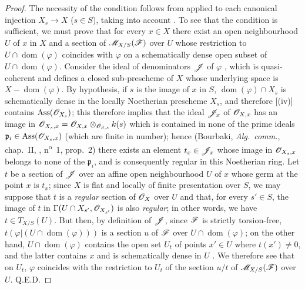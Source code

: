 \begin{proof}
The necessity of the condition follows from  applied to each canonical injection $X_s\to X$ ($s\in S$), taking into account .
To see that the condition is sufficient, we must prove that for every $x\in X$ there exist an open neighbourhood $U$ of $x$ in $X$ and a section of $\mathscr{M}_{X/S}(\mathscr{F})$ over $U$ whose restriction to $U\cap\operatorname{dom}(\varphi)$ coincides with $\varphi$ on a schematically dense open subset of $U\cap\operatorname{dom}(\varphi)$.
Consider the ideal of denominators $\mathscr{J}$ of $\varphi$ , which is quasi-coherent and defines a closed sub-prescheme of $X$ whose underlying space is $X-\operatorname{dom}(\varphi)$.
By hypothesis, if $s$ is the image of $x$ in $S$, $\operatorname{dom}(\varphi)\cap X_s$ is schematically dense in the locally Noetherian prescheme $X_s$, and therefore [(iv)] contains $\operatorname{Ass}(\mathscr{O}_{X_s})$; this therefore implies that the ideal $\mathscr{J}_x$ of $\mathscr{O}_{X,x}$ has an image in $\mathscr{O}_{X_s,x}=\mathscr{O}_{X,x}\otimes_{\mathscr{O}_{S,s}}k(s)$ which is contained in none of the prime ideals $\mathfrak{p}_i\in\operatorname{Ass}(\mathscr{O}_{X_s,x})$ (which are finite in number); hence (Bourbaki, \emph{Alg.~comm.}, chap.~II, , n\textsuperscript{o}~1, prop.~2) there exists an element $t_x\in\mathscr{J}_x$ whose image in $\mathscr{O}_{X_s,x}$ belongs to none of the $\mathfrak{p}_i$, and is consequently regular in this Noetherian ring.
Let $t$ be a section of $\mathscr{J}$ over an affine open neighbourhood $U$ of $x$ whose germ at the point $x$ is $t_x$; since $X$ is flat and locally of finite presentation over $S$, we may suppose  that $t$ is a \emph{regular} section of $\mathscr{O}_X$ over $U$ and that, for every $s'\in S$, the image of $t$ in $\Gamma(U\cap X_{s'},\mathscr{O}_{X_{s'}})$ is also \emph{regular}; in other words, we have $t\in T_{X/S}(U)$.
But then, by definition of $\mathscr{J}$, since $\mathscr{F}$ is strictly torsion-free, $t(\varphi|(U\cap\operatorname{dom}(\varphi)))$ is a section $u$ of $\mathscr{F}$ over $U\cap\operatorname{dom}(\varphi)$; on the other hand, $U\cap\operatorname{dom}(\varphi)$ contains the open set $U_t$ of points $x'\in U$ where $t(x')\neq0$, and the latter contains $x$ and is schematically dense in $U$ .
We therefore see that on $U_t$, $\varphi$ coincides with the restriction to $U_t$ of the section $u/t$ of $\mathscr{M}_{X/S}(\mathscr{F})$ over $U$.
Q.E.D.
\end{proof}

